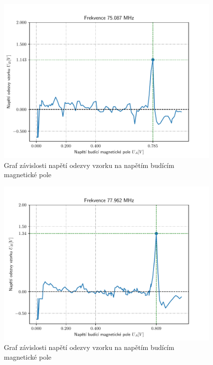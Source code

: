 \documentclass{article}
\begin{document}
\begin{figure}[!h]
  \hspace*{-10em}
  \includegraphics[scale=1.2]{figs/7.pdf}
  \caption{Graf závislosti napětí odezvy vzorku na napětím budícím magnetické pole}
\end{figure}
\begin{figure}[!h]
  \hspace*{-10em}
  \includegraphics[scale=1.2]{figs/8.pdf}
  \caption{Graf závislosti napětí odezvy vzorku na napětím budícím magnetické pole}
\end{figure}
\end{document}
